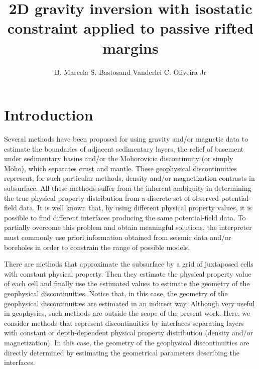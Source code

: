 \documentclass[manuscript]{geophysics}
\begin{document}
\title{2D gravity inversion with isostatic constraint applied to passive rifted margins}

\renewcommand{\thefootnote}{\fnsymbol{footnote}} 


\address{
\footnotemark[1]Observat\'{o}rio Nacional, \\
Department of Geophysics, \\
Rio de Janeiro, Brazil}
\author{B. Marcela S. Bastos\footnotemark[1] and Vanderlei C. Oliveira Jr\footnotemark[1]}


\maketitle

\begin{abstract}

\lipsum[1]

\end{abstract}

\section{Introduction}

Several methods have been proposed for using gravity and/or magnetic data to estimate
the boundaries of adjacent sedimentary layers, the relief of basement under sedimentary 
basins and/or the Mohorovicic discontinuity (or simply Moho), which separates crust and 
mantle.
These geophysical discontinuities represent, for such particular methods, 
density and/or magnetization contrasts in subsurface.
All these methods suffer from the inherent ambiguity \citep{roy1962, skeels1962} in
determining the true physical property distribution from a discrete set of
observed potential-field data. 
It is well known that, by using different physical property values, it is possible to
find different interfaces producing the same potential-field data. 
To partially overcome this problem and obtain meaningful solutions, the interpreter
must commonly use priori information obtained from seismic data and/or boreholes in
order to constrain the range of possible models.

There are methods that approximate the subsurface by a grid of
juxtaposed cells with constant physical property. 
Then they estimate the physical property value of each cell and finally 
use the estimated values to estimate the geometry of the geophysical discontinuities.
Notice that, in this case, the geometry of the geophysical discontinuities are
estimated in an indirect way. Although very useful in geophysics, such methods are
outside the scope of the present work.
Here, we consider methods that represent discontinuities by interfaces 
separating layers with constant or depth-dependent physical property distribution 
(density and/or magnetization).
In this case, the geometry of the geophysical discontinuities are directly determined
by estimating the geometrical parameters describing the interfaces.
\end{document}
